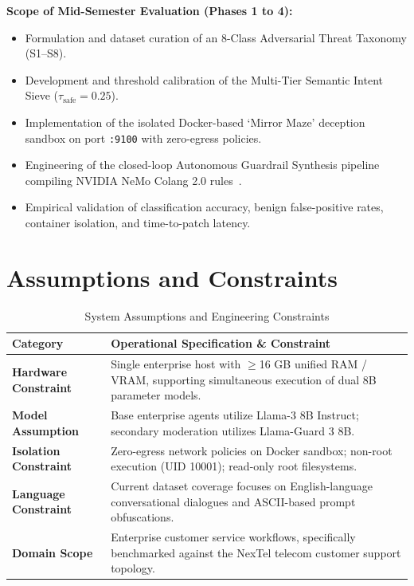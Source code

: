 \documentclass[12pt,a4paper,oneside]{report}
\begin{document}
\noindent\textbf{Scope of Mid-Semester Evaluation (Phases 1 to 4):}
\begin{itemize}
    \item Formulation and dataset curation of an 8-Class Adversarial Threat Taxonomy (S1--S8).
    \item Development and threshold calibration of the Multi-Tier Semantic Intent Sieve ($\tau_{\text{safe}} = 0.25$).
    \item Implementation of the isolated Docker-based `Mirror Maze' deception sandbox on port \texttt{:9100} with zero-egress policies.
    \item Engineering of the closed-loop Autonomous Guardrail Synthesis pipeline compiling NVIDIA NeMo Colang 2.0 rules~\cite{nemo2024guardrails}.
    \item Empirical validation of classification accuracy, benign false-positive rates, container isolation, and time-to-patch latency.
\end{itemize}

\section{Assumptions and Constraints}
\begin{table}[H]
\small
\renewcommand{\arraystretch}{1.2}
\begin{tabularx}{\textwidth}{@{}p{1.4in} X@{}}
\rowcolor{HeaderGray} \textbf{Category} & \textbf{Operational Specification \& Constraint} \\
\hline
\textbf{Hardware Constraint} & Single enterprise host with $\ge$16 GB unified RAM / VRAM, supporting simultaneous execution of dual 8B parameter models. \\
\textbf{Model Assumption} & Base enterprise agents utilize Llama-3 8B Instruct; secondary moderation utilizes Llama-Guard 3 8B. \\
\textbf{Isolation Constraint} & Zero-egress network policies on Docker sandbox; non-root execution (UID 10001); read-only root filesystems. \\
\textbf{Language Constraint} & Current dataset coverage focuses on English-language conversational dialogues and ASCII-based prompt obfuscations. \\
\textbf{Domain Scope} & Enterprise customer service workflows, specifically benchmarked against the NexTel telecom customer support topology. \\
\hline
\end{tabularx}
\caption{System Assumptions and Engineering Constraints}
\end{table}
\end{document}
